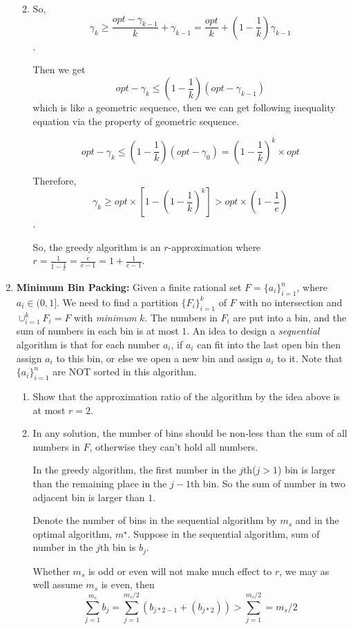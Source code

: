 \documentclass[12pt,a4paper]{article}
\makeatletter
\newtheorem*{solution}{Solution}
\theoremstyle{definition}
\renewenvironment{solution}[1][Solution] {\par\pushQED{\qed}\normalfont\topsep6\p@\@plus6\p@\relax\trivlist\item[\hskip\labelsep\bfseries#1\@addpunct{.}]\ignorespaces}{\popQED\endtrivlist\@endpefalse} \makeatother
\makeatother
\begin{document}
\begin{enumerate}
\begin{enumerate}
\begin{solution}
   	So, $$\gamma_k \geq \frac{opt-\gamma_{k-1}}{k} + \gamma_{k-1} = \frac{opt}{k} + (1-\frac{1}{k})\gamma_{k-1}$$.
   	
   	Then we get $$opt-\gamma_k \leq (1-\frac{1}{k})(opt-\gamma_{k-1})$$ which is like a geometric sequence, then we can get following inequality equation via the property of geometric sequence.
   	
   	$$opt-\gamma_k \leq (1-\frac{1}{k})(opt-\gamma_0) = (1-\frac{1}{k})^k\times opt$$
   	
   	Therefore, $$\gamma_k \geq opt\times\left[1-(1-\frac{1}{k})^k\right] > opt\times(1 - \frac{1}{e})$$.
   	
   	So, the greedy algorithm is an $r$-approximation where $r = \frac{1}{1-\frac{1}{e}} = \frac{e}{e-1} = 1+\frac{1}{e-1}$.
\end{solution}

\end{enumerate}

\item \textbf{Minimum Bin Packing:} Given a finite rational set $F=\{a_i\}_{i=1}^n$, where $a_i\in (0,1]$. We need to find a partition $\{F_i\}_{i=1}^k$ of $F$ with no intersection and $\cup_{i=1}^k F_i=F$ with \emph{minimum} $k$. The numbers in $F_i$ are put into a bin, and the sum of numbers in each bin is at most $1$. An idea to design a \emph{sequential} algorithm is that for each number $a_i$, if $a_i$ can fit into the last open bin then assign $a_i$ to this bin, or else we open a new bin and assign $a_i$ to it. Note that  $\{a_i\}_{i=1}^n$ are NOT sorted in this algorithm.
    \begin{enumerate}
    \item Show that the approximation ratio of the algorithm by the idea above is at most $r=2$.
    \begin{solution}
    	In any solution, the number of bins should be non-less than the sum of all numbers in $F$, otherwise they can't hold all numbers.
    	
    	In the greedy algorithm, the first number in the $j$th($j>1$) bin is larger than the remaining place in the $j-1$th bin. So the sum of number in two adjacent bin is larger than $1$.
    	
    	Denote the number of bins in the sequential algorithm by $m_s$ and in the optimal algorithm, $m^\star$. Suppose in the sequential algorithm, sum of number in the $j$th bin is $b_j$. 
    	
    	Whether $m_s$ is odd or even will not make much effect to $r$, we may as well assume $m_s$ is even, then $$\sum_{j=1}^{m_s}b_j = \sum_{j=1}^{m_s/2}(b_{j*2-1} + (b_{j*2})) > \sum_{j=1}^{m_s/2} = m_s/2$$
    	

\end{solution}
\end{enumerate}
\end{enumerate}
\end{document}
